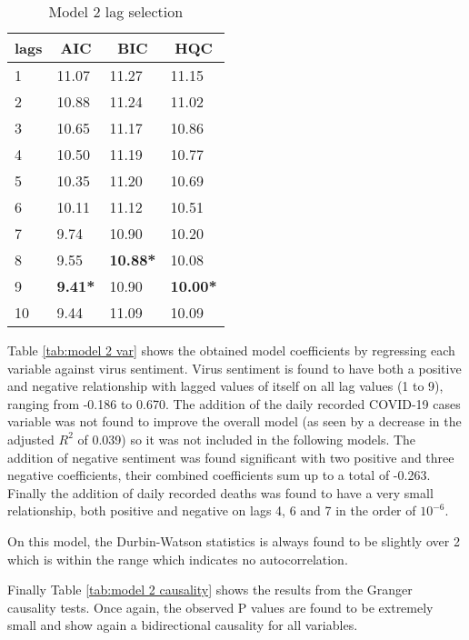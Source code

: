 \begin{table}[H]
\centering
\begin{tabular}{@{}llll@{}}
\toprule
\multicolumn{1}{c}{\textbf{lags}} & \multicolumn{1}{c}{\textbf{AIC}} & \multicolumn{1}{c}{\textbf{BIC}} & \multicolumn{1}{c}{\textbf{HQC}} \\ \midrule
1 & 11.07 & 11.27 & 11.15 \\
2 & 10.88 & 11.24 & 11.02 \\
3 & 10.65 & 11.17 & 10.86 \\
4 & 10.50 & 11.19 & 10.77 \\
5 & 10.35 & 11.20 & 10.69 \\
6 & 10.11 & 11.12 & 10.51 \\
7 & 9.74 & 10.90 & 10.20 \\
8 & 9.55 & \textbf{10.88*} & 10.08 \\
9 & \textbf{9.41*} & 10.90 & \textbf{10.00*} \\
10 & 9.44 & 11.09 & 10.09 \\ \bottomrule
\end{tabular}
\caption{Model 2 lag selection}
\label{tab:model 2 lag}
\end{table}


Table \ref{tab:model 2 var} shows the obtained model coefficients by regressing each variable against virus sentiment. Virus sentiment is found to have both a positive and negative relationship with lagged values of itself on all lag values (1 to 9), ranging from -0.186 to 0.670. The addition of the daily recorded COVID-19 cases variable was not found to improve the overall model (as seen by a decrease in the adjusted $R^2$ of 0.039) so it was not included in the following models.  The addition of negative sentiment was found significant with two positive and three negative coefficients, their combined coefficients sum up to a total of -0.263. Finally the addition of daily recorded deaths was found to have a very small relationship, both positive and negative on lags 4, 6 and 7 in the order of $10^{-6}$.

On this model, the Durbin-Watson statistics is always found to be slightly over 2 which is within the range which indicates no autocorrelation.

Finally Table \ref{tab:model 2 causality} shows the results from the Granger causality tests. Once again, the observed P values are found to be extremely small and show again a bidirectional causality for all variables.

